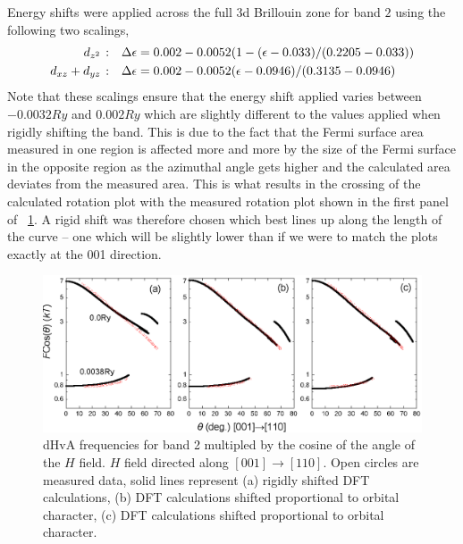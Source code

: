 {{{Energy shifts were applied across the full $3$d Brillouin zone for band $2$ using the following two scalings,
\begin{align*}
\textrm{\DzTwo:}\quad \Delta\epsilon &= 0.002 - 0.0052 (1 - (\epsilon - 0.033)/(0.2205 - 0.033)) \\
\textrm{\DxzDyz:}\quad \Delta\epsilon &= 0.002 - 0.0052 (\epsilon - 0.0946)/(0.3135 - 0.0946)
\end{align*}
Note that these scalings ensure that the energy shift applied varies between $-0.0032\unit{Ry}$ and $0.002\unit{Ry}$ which are slightly different to the values applied when rigidly shifting the band. This is due to the fact that the Fermi surface area measured in one region is affected more and more by the size of the Fermi surface in the opposite region as the azimuthal angle gets higher and the calculated area deviates from the measured area. This is what results in the crossing of the calculated rotation plot with the measured rotation plot shown in the first panel of \fig~\ref{Fig:3:Band2DCharacterRigidComparison}. A rigid shift was therefore chosen which best lines up along the length of the curve -- one which will be slightly lower than if we were to match the plots exactly at the 001 direction.

\begin{figure}[h!]
    \begin{center}
        \includegraphics[scale=0.8]{Chapter3-dHvABaFe2P2/Figures/AngleDepMeasurements/BandCharacterRotPlot/Band2_110_RotPlot_Comparison}
        \caption{dHvA frequencies for band 2 multipled by the cosine of the angle of the $H$ field. $H$ field directed along $[001]\rightarrow[110]$. Open circles are measured data, solid lines represent (a) rigidly shifted DFT calculations, (b) DFT calculations shifted proportional to \DzTwo orbital character, (c) DFT calculations shifted proportional to \DxzDyz orbital character.}
        \label{Fig:3:Band2DCharacterRigidComparison}
    \end{center}
\end{figure}

}}}
